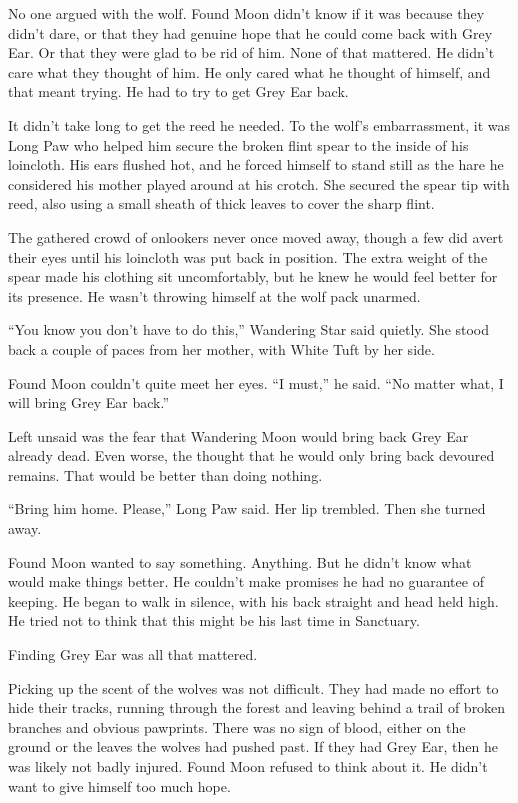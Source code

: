 No one argued with the wolf. Found Moon didn't know if it was because they didn't dare, or that they had genuine hope that he could come back with Grey Ear. Or that they were glad to be rid of him. None of that mattered. He didn't care what they thought of him. He only cared what he thought of himself, and that meant trying. He had to try to get Grey Ear back.

It didn't take long to get the reed he needed. To the wolf's embarrassment, it was Long Paw who helped him secure the broken flint spear to the inside of his loincloth. His ears flushed hot, and he forced himself to stand still as the hare he considered his mother played around at his crotch. She secured the spear tip with reed, also using a small sheath of thick leaves to cover the sharp flint.

The gathered crowd of onlookers never once moved away, though a few did avert their eyes until his loincloth was put back in position. The extra weight of the spear made his clothing sit uncomfortably, but he knew he would feel better for its presence. He wasn't throwing himself at the wolf pack unarmed.

``You know you don't have to do this,'' Wandering Star said quietly. She stood back a couple of paces from her mother, with White Tuft by her side.

Found Moon couldn't quite meet her eyes. ``I must,'' he said. ``No matter what, I will bring Grey Ear back.''

Left unsaid was the fear that Wandering Moon would bring back Grey Ear already dead. Even worse, the thought that he would only bring back devoured remains. That would be better than doing nothing.

``Bring him home. Please,'' Long Paw said. Her lip trembled. Then she turned away.

Found Moon wanted to say something. Anything. But he didn't know what would make things better. He couldn't make promises he had no guarantee of keeping. He began to walk in silence, with his back straight and head held high. He tried not to think that this might be his last time in Sanctuary.

Finding Grey Ear was all that mattered.

\secdiv

\noindent Picking up the scent of the wolves was not difficult. They had made no effort to hide their tracks, running through the forest and leaving behind a trail of broken branches and obvious pawprints. There was no sign of blood, either on the ground or the leaves the wolves had pushed past. If they had Grey Ear, then he was likely not badly injured. Found Moon refused to think about it. He didn't want to give himself too much hope.

